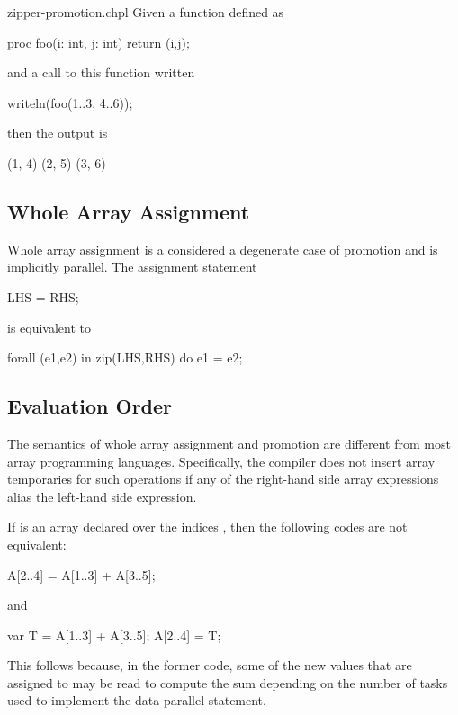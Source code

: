 \begin{chapelexample}{zipper-promotion.chpl}
Given a function defined as
\begin{chapel}
proc foo(i: int, j: int) {
  return (i,j);
}
\end{chapel}
and a call to this function written
\begin{chapel}
writeln(foo(1..3, 4..6));
\end{chapel}
then the output is
\begin{chapelprintoutput}{}
(1, 4) (2, 5) (3, 6)
\end{chapelprintoutput}
\end{chapelexample}

\subsection{Whole Array Assignment}
\label{Whole_Array_Assignment}

Whole array assignment is a considered a degenerate case of promotion
and is implicitly parallel.  The assignment statement
\begin{chapel}
LHS = RHS;
\end{chapel}
is equivalent to
\begin{chapel}
forall (e1,e2) in zip(LHS,RHS) do
  e1 = e2;
\end{chapel}

\subsection{Evaluation Order}
\label{Evaluation_Order}
The semantics of whole array assignment and promotion are different
from most array programming languages.  Specifically, the compiler
does not insert array temporaries for such operations if any of the
right-hand side array expressions alias the left-hand side expression.

%
%
\begin{example}
If  is an array declared over the indices , then
the following codes are not equivalent:
\begin{chapel}
A[2..4] = A[1..3] + A[3..5];
\end{chapel}
and
\begin{chapel}
var T = A[1..3] + A[3..5];
A[2..4] = T;
\end{chapel}
This follows because, in the former code, some of the new values that
are assigned to  may be read to compute the sum depending on
the number of tasks used to implement the data parallel statement.
\end{example}



